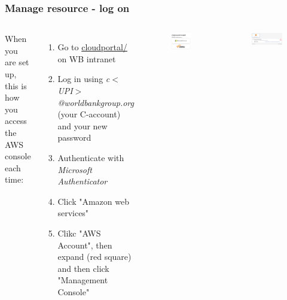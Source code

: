 \documentclass[aspectratio=169]{beamer} %
\begin{document}
\begin{frame}
	\frametitle{Manage resource - log on}
	
	
	\begin{columns}[c]
		
		
		When you are set up, this is how you access the AWS console each time:
		
		\begin{enumerate}
			\item Go to \url{cloudportal/} on WB intranet
			\item Log in using \textit{c$<$UPI$>$@worldbankgroup.org} (your C-account) and your new password
			\item Authenticate with \textit{Microsoft Authenticator}
			\item Click "Amazon web services"
			\item Clikc "AWS Account", then expand (red square) and then click "Management Console"
			
		\end{enumerate}
		
		\begin{figure}
			\centering
			\includegraphics[width=.5\textwidth]{./img/logon-1.png}
		\end{figure}
		\vspace{.2cm}
		\begin{figure}
			\centering
			\includegraphics[width=1\textwidth]{./img/logon-2.png}
		\end{figure}
	\end{columns}
\end{frame}
\end{document}
